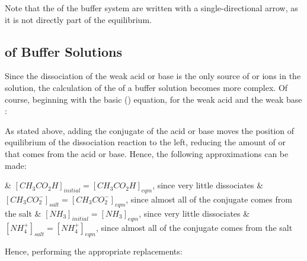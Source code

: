 				Note that the  of the buffer system are written with a single-directional arrow, as it is not
				directly part of the equilibrium.




		\pagebreak
		\subsection{\MpH{} of Buffer Solutions}

			Since the dissociation of the weak acid or base is  the only source of  or  ions in the solution,
			the calculation of the \pH{} of a buffer solution becomes more complex. Of course, beginning with the basic ()
			equation, for the weak acid  and the weak base :


			As stated above, adding the conjugate of the acid or base moves the position of equilibrium of the dissociation reaction to the left,
			reducing the amount of  or  that comes from the acid or base. Hence, the following approximations can be made:

			\begin{bulletlist}
				& $[CH_{3}CO_{2}H]_{initial} = [CH_{3}CO_{2}H]_{eqm}$, since very little  dissociates
				& $[CH_{3}CO_{2}^{-}]_{salt} = [CH_{3}CO_{2}^{-}]_{eqm}$, since almost all of the conjugate comes from the salt
					\linebreak\linebreak{}
				& $[NH_{3}]_{initial} = [NH_{3}]_{eqm}$, since very little  dissociates
				& $[NH_{4}^{+}]_{salt} = [NH_{4}^{+}]_{eqm}$, since almost all of the conjugate comes from the salt
			\end{bulletlist}

			Hence, performing the appropriate replacements:


